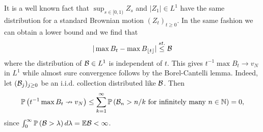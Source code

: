 It is a well known fact that $\sup_{s \in [0, 1)} Z_s$ and $|Z_1| \in L^1$ have the same distribution for a standard Brownian motion $(Z_t)_{t \geq 0}$. In the same fashion we can obtain a lower bound and we find that
\begin{equation}
|\max B_t - \max B_{\floor{t}}| \stackrel{st.}{\leq} \cal{B}
\end{equation}
where the distribution of $\cal{B} \in L^1$ is independent of $t$. This gives $t^{-1} \max B_t \to v_N$ in $L^1$ while almost sure convergence follows by the Borel-Cantelli lemma. Indeed, let $(\cal{B}_j)_{j \geq 0}$ be an i.i.d. collection distributed like $\cal{B}$. Then
\begin{equation}\nonumber
\Pr{t^{-1} \max B_t \nrightarrow v_N} \leq \sum\limits_{k = 1}^\infty \Pr{\cal{B}_n > n/k \text{ for infinitely many }n \in \N} = 0, 
\end{equation}
since $\int_0^\infty \Pr{\cal{B} > \lambda} d\lambda = \E\cal{B} < \infty$. 







